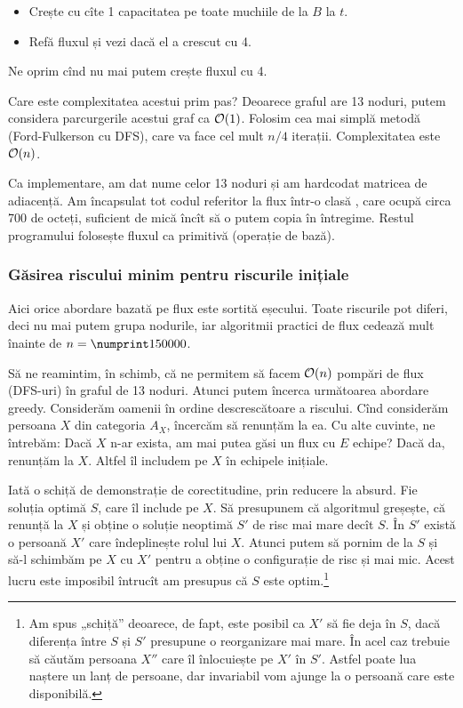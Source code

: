 \documentclass[../main.tex]{subfiles}
\begin{document}
\begin{itemize}
  \item Crește cu cîte 1 capacitatea pe toate muchiile de la $B$ la $t$.
  \item Refă fluxul și vezi dacă el a crescut cu 4.
\end{itemize}

Ne oprim cînd nu mai putem crește fluxul cu 4.

Care este complexitatea acestui prim pas? Deoarece graful are 13 noduri, putem considera parcurgerile acestui graf ca $\mathcal{O}(1)$. Folosim cea mai simplă metodă (Ford-Fulkerson cu DFS), care va face cel mult $n/4$ iterații. Complexitatea este $\mathcal{O}(n)$.

Ca implementare, am dat nume celor 13 noduri și am hardcodat matricea de adiacență. Am încapsulat tot codul referitor la flux într-o clasă , care ocupă circa 700 de octeți, suficient de mică încît să o putem copia în întregime. Restul programului folosește fluxul ca primitivă (operație de bază).

\subsubsection*{Găsirea riscului minim pentru riscurile inițiale}

Aici orice abordare bazată pe flux este sortită eșecului. Toate riscurile pot diferi, deci nu mai putem grupa nodurile, iar algoritmii practici de flux cedează mult înainte de $n = \np{150000}$.

Să ne reamintim, în schimb, că ne permitem să facem $\mathcal{O}(n)$ pompări de flux (DFS-uri) în graful de 13 noduri. Atunci putem încerca următoarea abordare greedy. Considerăm oamenii în ordine descrescătoare a riscului. Cînd considerăm persoana $X$ din categoria $A_X$, încercăm să renunțăm la ea. Cu alte cuvinte, ne întrebăm: Dacă $X$ n-ar exista, am mai putea găsi un flux cu $E$ echipe? Dacă da, renunțăm la $X$. Altfel îl includem pe $X$ în echipele inițiale.

Iată o schiță de demonstrație de corectitudine, prin reducere la absurd. Fie soluția optimă $S$, care îl include pe $X$. Să presupunem că algoritmul greșește, că renunță la $X$ și obține o soluție neoptimă $S'$ de risc mai mare decît $S$. În $S'$ există o persoană $X'$ care îndeplinește rolul lui $X$. Atunci putem să pornim de la $S$ și să-l schimbăm pe $X$ cu $X'$ pentru a obține o configurație de risc și mai mic. Acest lucru este imposibil întrucît am presupus că $S$ este optim.\footnote{Am spus „schiță” deoarece, de fapt, este posibil ca $X'$ să fie deja în $S$, dacă diferența între $S$ și $S'$ presupune o reorganizare mai mare. În acel caz trebuie să căutăm persoana $X''$ care îl înlocuiește pe $X'$ în $S'$. Astfel poate lua naștere un lanț de persoane, dar invariabil vom ajunge la o persoană care este disponibilă.}
\end{document}

